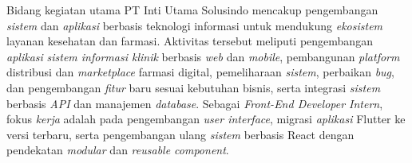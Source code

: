 \documentclass[12pt, a4paper]{article}
\begin{document}
Bidang kegiatan utama PT Inti Utama Solusindo mencakup pengembangan
\textit{sistem} dan \textit{aplikasi} berbasis teknologi informasi untuk
mendukung \textit{ekosistem} layanan kesehatan dan farmasi. Aktivitas tersebut
meliputi pengembangan \textit{aplikasi} \textit{sistem informasi klinik}
berbasis \textit{web} dan \textit{mobile}, pembangunan \textit{platform}
distribusi dan \textit{marketplace} farmasi digital, pemeliharaan
\textit{sistem}, perbaikan \textit{bug}, dan pengembangan \textit{fitur} baru
sesuai kebutuhan bisnis, serta integrasi \textit{sistem} berbasis \textit{API}
dan manajemen \textit{database}. Sebagai \textit{Front-End Developer Intern},
fokus \textit{kerja} adalah pada pengembangan \textit{user interface}, migrasi
\textit{aplikasi} Flutter ke versi terbaru, serta pengembangan ulang
\textit{sistem} berbasis React dengan pendekatan \textit{modular} dan
\textit{reusable component}.
\end{document}
